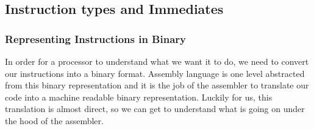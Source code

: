 \documentclass{article}
\begin{document}
\subsection{Instruction types and Immediates}
\subsubsection{Representing Instructions in Binary}
In order for a processor to understand what we want it to do, we need to convert our instructions into a binary format. Assembly language is one level abstracted from this binary representation and it is the job of the assembler to translate our code into a machine readable binary representation. Luckily for us, this translation is almost direct, so we can get to understand what is going on under the hood of the assembler.
\end{document}
